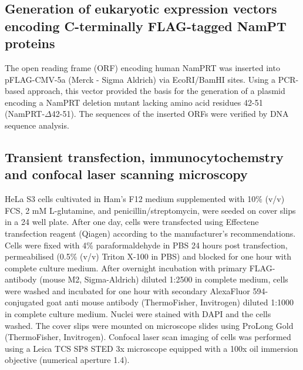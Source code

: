 \subsection{Generation of eukaryotic expression vectors encoding C-terminally FLAG-tagged NamPT proteins}

The open reading frame (ORF) encoding human NamPRT was inserted into pFLAG-CMV-5a (Merck - Sigma Aldrich) via EcoRI/BamHI sites. Using a PCR-based approach, this vector provided the basis for the generation of a plasmid encoding a NamPRT deletion mutant lacking amino acid residues 42-51 (NamPRT-$\Delta$42-51). The sequences of the inserted ORFs were verified by DNA sequence analysis.


\subsection{Transient transfection, immunocytochemstry and confocal laser scanning microscopy}

HeLa S3 cells cultivated in Ham’s F12 medium supplemented with 10\% (v/v) FCS, 2 mM L-glutamine, and penicillin/streptomycin, were seeded on cover slips in a 24 well plate. After one day, cells were transfected using Effectene transfection reagent (Qiagen) according to the manufacturer’s recommendations. Cells were fixed with 4\% paraformaldehyde in PBS 24 hours post transfection, permeabilised (0.5\% (v/v) Triton X-100 in PBS) and blocked for one hour with complete culture medium. After overnight incubation with primary FLAG-antibody (mouse M2, Sigma-Aldrich) diluted 1:2500 in complete medium, cells were washed and incubated for one hour with secondary AlexaFluor 594-conjugated goat anti mouse antibody (ThermoFisher, Invitrogen) diluted 1:1000 in complete culture medium. Nuclei were stained with DAPI and the cells washed. The cover slips were mounted on microscope slides using ProLong Gold (ThermoFisher, Invitrogen). Confocal laser scan imaging of cells was performed using a Leica TCS SP8 STED 3x microscope equipped with a 100x oil immersion objective (numerical aperture 1.4).
